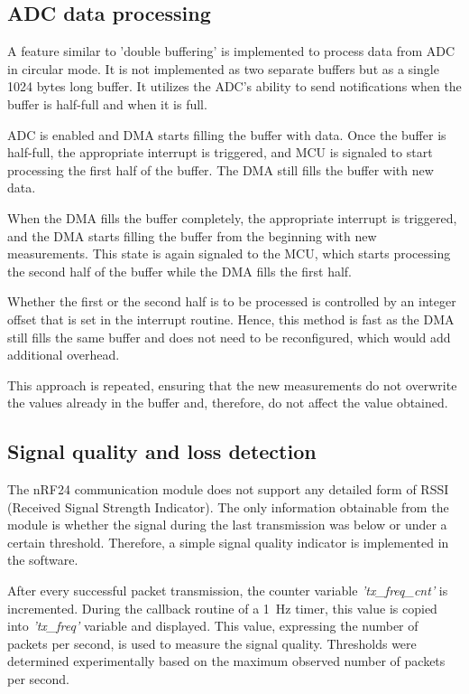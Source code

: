 \subsection{ADC data processing}
\label{sub:adc}
A feature similar to 'double buffering' is implemented to process data from ADC in circular mode. It is not implemented as two separate buffers but as a single 1024 bytes long buffer. It utilizes the ADC's ability to send notifications when the buffer is half-full and when it is full.

ADC is enabled and DMA starts filling the buffer with data. Once the buffer is half-full, the appropriate interrupt is triggered, and MCU is signaled to start processing the first half of the buffer. The DMA still fills the buffer with new data.

When the DMA fills the buffer completely, the appropriate interrupt is triggered, and the DMA starts filling the buffer from the beginning with new measurements. This state is again signaled to the MCU, which starts processing the second half of the buffer while the DMA fills the first half.

Whether the first or the second half is to be processed is controlled by an integer offset that is set in the interrupt routine. Hence, this method is fast as the DMA still fills the same buffer and does not need to be reconfigured, which would add additional overhead.

This approach is repeated, ensuring that the new measurements do not overwrite the values already in the buffer and, therefore, do not affect the value obtained.

\subsection{Signal quality and loss detection}
\label{sub:tx_sig_loss}
The nRF24 communication module does not support any detailed form of RSSI (Received Signal Strength Indicator). The only information obtainable from the module is whether the signal during the last transmission was below or under a certain threshold. Therefore, a simple signal quality indicator is implemented in the software.

After every successful packet transmission, the counter variable \textit{'tx\_freq\_cnt'} is incremented. During the callback routine of a \SI{1}{\Hz} timer, this value is copied into \textit{'tx\_freq'} variable and displayed. This value, expressing the number of packets per second, is used to measure the signal quality. Thresholds were determined experimentally based on the maximum observed number of packets per second.

